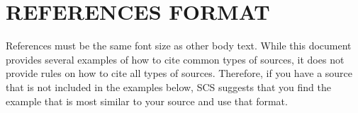 \documentclass{scsPaperFormattingTemplate-LaTex-Revised20160302}
\begin{document}
\section*{REFERENCES FORMAT}
References must be the same font size as other body text. While this document provides several examples of how to cite common types of sources, it does not provide rules on how to cite all types of sources. Therefore, if you have a source that is not included in the examples below, SCS suggests that you find the example that is most similar to your source and use that format.



\end{document}
